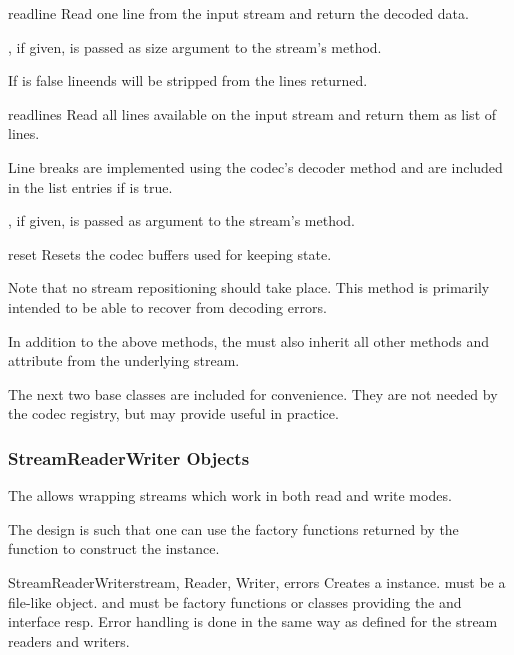 \begin{methoddesc}{readline}{}
  Read one line from the input stream and return the
  decoded data.

  , if given, is passed as size argument to the stream's
   method.

  If  is false lineends will be stripped from the
  lines returned.

\end{methoddesc}

\begin{methoddesc}{readlines}{}
  Read all lines available on the input stream and return them as list
  of lines.

  Line breaks are implemented using the codec's decoder method and are
  included in the list entries if  is true.

  , if given, is passed as  argument to the
  stream's  method.
\end{methoddesc}

\begin{methoddesc}{reset}{}
  Resets the codec buffers used for keeping state.

  Note that no stream repositioning should take place.  This method is
  primarily intended to be able to recover from decoding errors.
\end{methoddesc}

In addition to the above methods, the  must also
inherit all other methods and attribute from the underlying stream.

The next two base classes are included for convenience. They are not
needed by the codec registry, but may provide useful in practice.


\subsubsection{StreamReaderWriter Objects \label{stream-reader-writer}}

The  allows wrapping streams which work in
both read and write modes.

The design is such that one can use the factory functions returned by
the  function to construct the instance.

\begin{classdesc}{StreamReaderWriter}{stream, Reader, Writer, errors}
  Creates a  instance.
   must be a file-like object.
   and  must be factory functions or classes
  providing the  and  interface
  resp.
  Error handling is done in the same way as defined for the
  stream readers and writers.
\end{classdesc}

